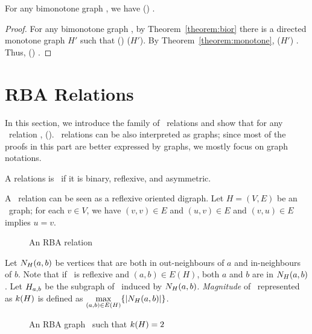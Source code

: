 \begin{theorem} [Bimonotone]
For any bimonotone graph \mH, we have \chom(\mH) \maple \cbis\@.
\end{theorem}

\begin{proof}
For any bimonotone graph \mH, by Theorem~\ref{theorem:bior} there is a directed monotone 
graph \(H'\) such that \chom(\mH) \maple \chom(\(H'\))\@. By Theorem~\ref{theorem:monotone},
\chom(\(H'\)) \maple \cbis\@. Thus, \chom(\mH) \maple \cbis\@.
\end{proof}

\section{RBA Relations}
In this section,  we introduce the family of \RBA\ relations and show that
for any \RBA\ relation \mR, \cbis \maple \ccsp(\mR)\@.
\RBA\ relations can be also interpreted as graphs; since most of the proofs in this part
are better expressed by graphs, we mostly focus on graph notations.

\begin{defi} [\RBA]
A relations is \RBA\ if it is binary, reflexive, and asymmetric.
\end{defi} 

A \RBA\ relation can be seen as a reflexive oriented digraph. Let \(H=(V,E)\) be 
an \RBA\ graph; for each \(v \in V\), we have \((v,v) \in E\)
and \((u,v) \in E\) and \((v,u) \in E\) implies \(u=v\)\@.

\begin{figure}[h]
\center{}
\caption{An RBA relation}
\end{figure}

Let \(N_{H}({a},{b})\) be vertices that are both in out-neighbours of \(a\) and in-neighbours of \(b\).
Note that if \mH\ is reflexive and \((a,b)\in E(H)\),
both \(a\) and \(b\) are in \(N_{H}({a},{b})\)\@.
Let \(H_{a,b}\) be the subgraph of \mH\ induced by \(N_{H}({a},{b})\).
\emph{Magnitude} of \mH\ represented as \(k(H)\) is defined as
\(\max \limits_{(a,b) \in E(H)} \{{|N_{H}({a},{b})|}\}\)\@.

\begin{figure}[h]
\center{}
\caption{An RBA graph \mH\ such that \(k(H)=2\)}
\end{figure}


